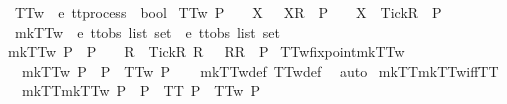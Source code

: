 \begin{isabellebody}
%
\endisadelimproof
\isanewline
{}\isamarkupfalse%
\ TT{}w\ {\isacharcolon}{\isacharcolon}\ {\isachardoublequoteopen}{\isacharprime}e\ ttprocess\ {\isasymRightarrow}\ bool{\isachardoublequoteclose}\ \isanewline
{\isachardoublequoteopen}TT{}w\ P\ {\isacharequal}\ {\isacharparenleft}{\isasymforall}\ {\isasymrho}\ X{\isachardot}\ {\isasymrho}\ {\isacharat}\ {\isacharbrackleft}{\isacharbrackleft}X{\isacharbrackright}\isactrlsub R{\isacharbrackright}\ {\isasymin}\ P\ {\isasymlongrightarrow}\ {\isasymrho}\ {\isacharat}\ {\isacharbrackleft}{\isacharbrackleft}X\ {\isasymunion}\ {\isacharbraceleft}Tick{\isacharbraceright}{\isacharbrackright}\isactrlsub R{\isacharbrackright}\ {\isasymin}\ P{\isacharparenright}{\isachardoublequoteclose}\isanewline
\isanewline
{}\isamarkupfalse%
\ mkTT{}w\ {\isacharcolon}{\isacharcolon}\ {\isachardoublequoteopen}{\isacharprime}e\ ttobs\ list\ set\ {\isasymRightarrow}\ {\isacharprime}e\ ttobs\ list\ set{\isachardoublequoteclose}\ \isanewline
{\isachardoublequoteopen}mkTT{}w\ P\ {\isacharequal}\ P\ {\isasymunion}\ {\isacharbraceleft}{\isasymrho}\ {\isacharat}\ {\isacharbrackleft}{\isacharbrackleft}R\ {\isasymunion}\ {\isacharbraceleft}Tick{\isacharbraceright}{\isacharbrackright}\isactrlsub R{\isacharbrackright}{\isacharbar}{\isasymrho}\ R{\isachardot}\ {\isasymrho}\ {\isacharat}\ {\isacharbrackleft}{\isacharbrackleft}R{\isacharbrackright}\isactrlsub R{\isacharbrackright}\ {\isasymin}\ P{\isacharbraceright}{\isachardoublequoteclose}\isanewline
\isanewline
{}\isamarkupfalse%
\ TT{}w{\isacharunderscore}fixpoint{\isacharunderscore}mkTT{}w{\isacharcolon}\isanewline
\ \ {\isachardoublequoteopen}{\isacharparenleft}mkTT{}w\ P\ {\isacharequal}\ P{\isacharparenright}\ {\isacharequal}\ TT{}w\ P{\isachardoublequoteclose}\isanewline
%
\isadelimproof
\ \ %
\endisadelimproof
%
\isatagproof
{}\isamarkupfalse%
\ mkTT{}w{\isacharunderscore}def\ TT{}w{\isacharunderscore}def\ \isamarkupfalse%
\ auto%
\endisatagproof
{\isafoldproof}%
%
\isadelimproof
\isanewline
%
\endisadelimproof
\isanewline
{}\isamarkupfalse%
\ mkTT{}{\isacharunderscore}mkTT{}w{\isacharunderscore}iff{\isacharunderscore}TT{}{}{\isacharcolon}\isanewline
\ \ {\isachardoublequoteopen}{\isacharparenleft}mkTT{}{\isacharparenleft}mkTT{}w\ P{\isacharparenright}\ {\isacharequal}\ P{\isacharparenright}\ {\isacharequal}\ {\isacharparenleft}TT{}\ P\ {\isasymand}\ TT{}w\ P{\isacharparenright}{\isachardoublequoteclose}\isanewline

\end{isabellebody}
